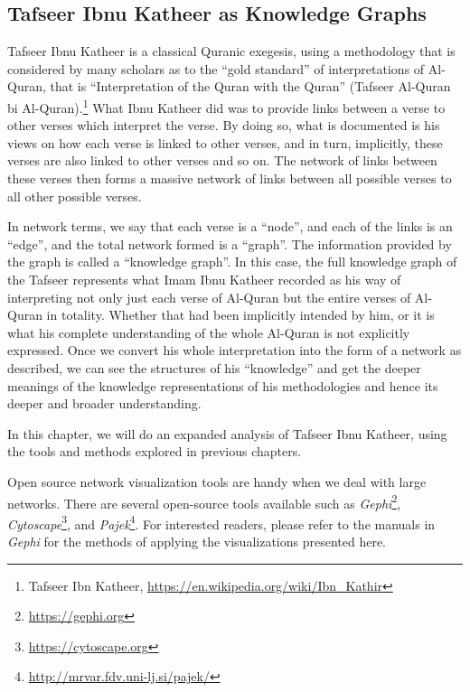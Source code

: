 \documentclass[
]{article}
\begin{document}
\hypertarget{tafseer-Ibnu-Katheer-as-knowledge-graphs}{%
\subsection{Tafseer Ibnu Katheer as Knowledge Graphs}\label{tafseer-Ibnu-Katheer-as-knowledge-graphs}}

Tafseer Ibnu Katheer is a classical Quranic exegesis, using a methodology that is considered by many scholars as to the ``gold standard'' of interpretations of Al-Quran, that is ``Interpretation of the Quran with the Quran'' (Tafseer Al-Quran bi Al-Quran).\footnote{Tafseer Ibn Katheer, \url{https://en.wikipedia.org/wiki/Ibn_Kathir}} What Ibnu Katheer did was to provide links between a verse to other verses which interpret the verse. By doing so, what is documented is his views on how each verse is linked to other verses, and in turn, implicitly, these verses are also linked to other verses and so on. The network of links between these verses then forms a massive network of links between all possible verses to all other possible verses.

In network terms, we say that each verse is a ``node'', and each of the links is an ``edge'', and the total network formed is a ``graph''. The information provided by the graph is called a ``knowledge graph''. In this case, the full knowledge graph of the Tafseer represents what Imam Ibnu Katheer recorded as his way of interpreting not only just each verse of Al-Quran but the entire verses of Al-Quran in totality. Whether that had been implicitly intended by him, or it is what his complete understanding of the whole Al-Quran is not explicitly expressed. Once we convert his whole interpretation into the form of a network as described, we can see the structures of his ``knowledge'' and get the deeper meanings of the knowledge representations of his methodologies and hence its deeper and broader understanding.

In this chapter, we will do an expanded analysis of Tafseer Ibnu Katheer, using the tools and methods explored in previous chapters.

Open source network visualization tools are handy when we deal with large networks. There are several open-source tools available such as \emph{Gephi}\footnote{\url{https://gephi.org}}, \emph{Cytoscape}\footnote{\url{https://cytoscape.org}}, and \emph{Pajek}\footnote{\url{http://mrvar.fdv.uni-lj.si/pajek/}}. For interested readers, please refer to the manuals in \emph{Gephi} for the methods of applying the visualizations presented here.
\end{document}
